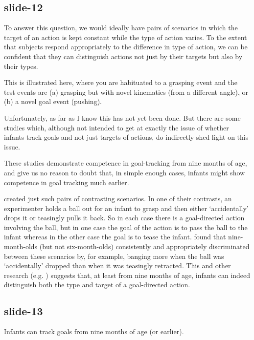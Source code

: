 \documentclass[12pt,\papersize]{extarticle}
\begin{document}
\subsection{slide-12}
To answer this question, we would ideally have pairs of scenarios in which the target of an action
is kept constant while the type of action varies.
To the extent that subjects respond appropriately to the difference in type of action, we can be
confident that they can distinguish actions not just by their targets but also by their types.
 
This is illustrated here, where you are habituated to a grasping event and the test events are
(a) grasping but with novel kinematics (from a different angle), or (b) a novel goal event (pushing).
 
Unfortunately, as far as I know this has not yet been done.
But there are some studies which, although not intended to get at exactly the issue of whether
infants track goals and not just targets of actions, do indirectly shed light on this issue.
 
These studies demonstrate competence in goal-tracking from nine months of age, and give us no reason
to doubt that, in simple enough cases, infants might show competence in goal tracking much earlier.
 
\citet{Behne:2005dw} created just such pairs of contrasting scenarios.
In one of their contrasts, an experimenter holds a ball out for an infant to grasp and then
either ‘accidentally’ drops it or teasingly pulls it back.
So in each case there is a goal-directed action involving the ball, but in one case the goal
of the action is to pass the ball to the infant whereas in the other case the goal is to
tease the infant.
\citet[Study 2]{Behne:2005dw} found that nine-month-olds (but not six-month-olds)
consistently and appropriately discriminated between these scenarios by, for example,
banging more when the ball was ‘accidentally’ dropped than when it was teasingly retracted.
This and other research
(e.g. \citealp{ambrosini:2013_looking}) suggests that, at least from nine months of age,
infants can indeed distinguish both the type and target of a goal-directed action.
 
 
\subsection{slide-13}
Infants can track goals from nine months of age (or earlier).
 
\end{document}
